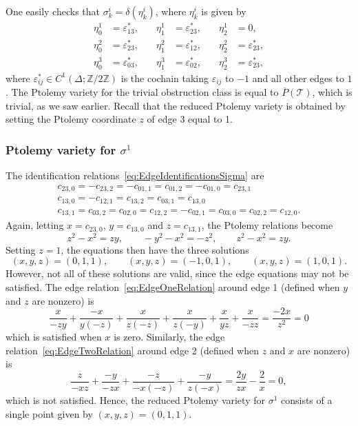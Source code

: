 \documentclass[11pt]{amsart}
\theoremstyle{plain}
\theoremstyle{definition}
\numberwithin{equation}{section}
\newcommand{\Z}{\mathbb Z}
\newcommand{\T}{\mathcal T}
\begin{document}
One easily checks that $\sigma^i_k=\delta(\eta_k^i)$, where $\eta^i_k$ is given by
\begin{equation}
\begin{aligned}
\eta^1_0&=\varepsilon_{13}^*,\quad&\eta^1_1&=\varepsilon_{23}^*,\quad&\eta^1_2&=0,\\
\eta^2_0&=\varepsilon_{23}^*,\quad&\eta^2_1&=\varepsilon_{12}^*,\quad&\eta^2_2&=\varepsilon_{23}^*,\\
\eta^3_0&=\varepsilon_{03}^*,\quad&\eta^3_1&=\varepsilon_{02}^*,\quad&\eta^3_2&=\varepsilon_{23}^*,
\end{aligned}
\end{equation}
where $\varepsilon_{ij}^*\in C^1(\Delta;\Z/2\Z)$ is the cochain taking $\varepsilon_{ij}$ to $-1$ and all other edges to $1$.
The Ptolemy variety for the trivial obstruction class is equal to $\overline P(\T)$, which is trivial, as we saw earlier.
Recall that the reduced Ptolemy variety is obtained by setting the Ptolemy coordinate $z$ of edge 3 equal to 1.
\subsubsection{Ptolemy variety for $\sigma^1$}
The identification relations~\eqref{eq:EdgeIdentificationsSigma} are
\begin{equation}
\begin{gathered}
c_{23,0}=-c_{23,2}=-c_{01,1}=c_{01,2}=-c_{01,0}=c_{23,1}\\
c_{13,0}=-c_{12,1}=c_{13,2}=c_{03,1}=c_{13,0}\\
c_{13,1}=c_{03,2}=c_{02,0}=c_{12,2}=-c_{02,1}=c_{03,0}=c_{02,2}=c_{12,0}.
\end{gathered}
\end{equation}
Again, letting $x=c_{23,0}$, $y=c_{13,0}$ and $z=c_{13,1}$, the Ptolemy relations become
\begin{equation}\label{eq:m009PtolemyPSL1}
z^2-x^2=zy,\qquad -y^2-x^2=-z^2,\qquad z^2-x^2=zy.
\end{equation}
Setting $z=1$, the equations then have the three solutions
\begin{equation}
(x,y,z)=(0,1,1),\qquad (x,y,z)=(-1,0,1),\qquad (x,y,z)=(1,0,1).
\end{equation}
However, not all of these solutions are valid, since the edge equations may not be satisfied. The edge relation~\eqref{eq:EdgeOneRelation} around edge 1 (defined when $y$ and $z$ are nonzero) is
\begin{equation}
\frac{x}{-zy}+\frac{-x}{y(-z)}+\frac{x}{z(-z)}+\frac{x}{z(-y)}+\frac{x}{yz}+\frac{x}{-zz}=\frac{-2x}{z^2}=0
\end{equation}
which is satisfied when $x$ is zero. Similarly, the edge relation~\eqref{eq:EdgeTwoRelation} around edge 2 (defined when $z$ and $x$ are nonzero) is
\begin{equation}
\frac{z}{-xz}+\frac{-y}{-zx}+\frac{-z}{-x(-z)}+\frac{-y}{z(-x)}=\frac{2y}{zx}-\frac{2}{x}=0,
\end{equation}
which is not satisfied. Hence, the reduced Ptolemy variety for $\sigma^1$ consists of a single point given by $(x,y,z)=(0,1,1)$.
\end{document}

